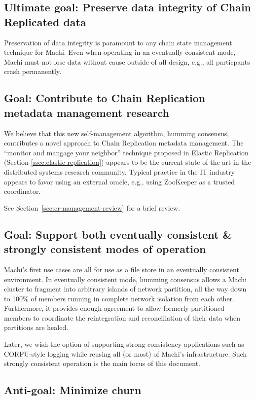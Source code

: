 \documentclass[preprint,10pt]{sigplanconf}
\begin{document}
\subsection{Ultimate goal: Preserve data integrity of Chain Replicated data}

Preservation of data integrity is paramount to any chain state
management technique for Machi.  Even when operating in an eventually
consistent mode, Machi must not lose data without cause outside of all
design, e.g., all particpants crash permanently.

\subsection{Goal: Contribute to Chain Replication metadata management research}

We believe that this new self-management algorithm, humming consensus,
contributes a novel approach to Chain Replication metadata management.
The ``monitor
and mangage your neighbor'' technique proposed in Elastic Replication
(Section \ref{ssec:elastic-replication}) appears to be the current
state of the art in the distributed systems research community.
Typical practice in the IT industry appears to favor using an external
oracle, e.g., using ZooKeeper as a trusted coordinator.  

See Section~\ref{sec:cr-management-review} for a brief review.

\subsection{Goal: Support both eventually consistent \& strongly consistent modes of operation}

Machi's first use cases are all for use as a file store in an eventually
consistent environment.
In eventually consistent mode, humming consensus
allows a Machi cluster to fragment into
arbitrary islands of network partition, all the way down to 100\% of
members running in complete network isolation from each other.
Furthermore, it provides enough agreement to allow
formerly-partitioned members to coordinate the reintegration and
reconciliation of their data when partitions are healed.

Later, we wish the option of supporting strong consistency
applications such as CORFU-style logging while reusing all (or most)
of Machi's infrastructure.  Such strongly consistent operation is the
main focus of this document.

\subsection{Anti-goal: Minimize churn}
\end{document}
